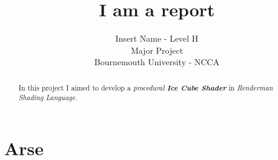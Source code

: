\documentclass[11pt,a4paper,final,notitlepage]{report}
\begin{document}
\title{ I am a report }

\author{ 	Insert Name - Level H\\
			Major Project\\
			Bournemouth University - NCCA}

\maketitle

\begin{abstract}
\begin{center}

In this project I aimed to develop a \textit{procedural \textbf{Ice Cube Shader}} in \textit{Renderman Shading Language}. 

\end{center}
\end{abstract}


\tableofcontents

\chapter{Arse}
\end{document}
